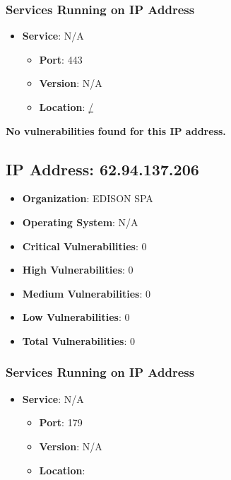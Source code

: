 \documentclass{article}
\begin{document}
\subsubsection*{Services Running on IP Address}

\begin{itemize}
    
        \item \textbf{Service}: N/A
        \begin{itemize}
            \item \textbf{Port}: 443
            \item \textbf{Version}:  N/A 
            \item \textbf{Location}: \href{ / }{ / }
        \end{itemize}
    
\end{itemize}


\textbf{No vulnerabilities found for this IP address.}




\clearpage



\subsection{IP Address: 62.94.137.206}

\begin{itemize}
    \item \textbf{Organization}: EDISON SPA
    \item \textbf{Operating System}:  N/A 
    \item \textbf{Critical Vulnerabilities}: 0
    \item \textbf{High Vulnerabilities}: 0
    \item \textbf{Medium Vulnerabilities}: 0
    \item \textbf{Low Vulnerabilities}: 0
    \item \textbf{Total Vulnerabilities}: 0
\end{itemize}

\subsubsection*{Services Running on IP Address}

\begin{itemize}
    
        \item \textbf{Service}: N/A
        \begin{itemize}
            \item \textbf{Port}: 179
            \item \textbf{Version}:  N/A 
            \item \textbf{Location}: \href{  }{  }
        \end{itemize}
    
\end{itemize}
\end{document}
